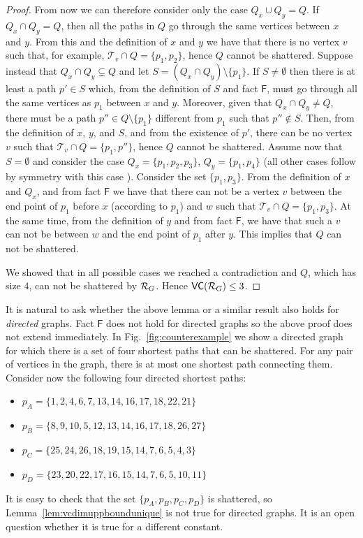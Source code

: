 \begin{proof}
  From now we can therefore consider only the case $Q_x\cup Q_y=Q$. If $Q_x\cap
  Q_y=Q$, then all the paths in $Q$ go through the same vertices between $x$ and
  $y$. From this and the definition of $x$ and $y$ we have that there is no
  vertex $v$ such that, for example, $\mathcal{T}_v\cap Q=\{p_1,p_2\}$, hence
  $Q$ cannot be shattered. Suppose instead that $Q_x\cap Q_y\subsetneq Q$ and let $S=(Q_x\cap
  Q_y)\setminus\{p_1\}$. If $S\neq\emptyset$ then there is at least a path
  $p'\in S$ which, from the definition of $S$ and fact $\mathsf{F}$, must go
  through all the same vertices as $p_1$ between $x$ and $y$. Moreover, given
  that $Q_x\cap Q_y\neq Q$, there must be a path $p''\in Q\setminus\{p_1\}$
  different from $p_1$ such that $p''\notin S$. Then, from the definition of
  $x$, $y$, and $S$, and from the existence of $p'$, there can be no vertex $v$
  such that $\mathcal{T}_v\cap Q=\{p_1,p''\}$, hence $Q$ cannot be shattered.
  Assume now that $S=\emptyset$ and consider the case $Q_x=\{p_1,p_2,p_3\}$,
  $Q_y=\{p_1,p_4\}$ (all other cases follow by symmetry with this case ).
  Consider the set $\{p_1,p_3\}$. From the definition of $x$ and $Q_x$, and from
  fact $\mathsf{F}$ we have that there can not be a vertex $v$ between the end
  point of $p_1$ before $x$ (according to $p_1$) and $w$ such that $\mathcal{T}_v\cap Q=\{p_1,p_3\}$.
  At the same time, from the definition of $y$ and from fact $\mathsf{F}$, we
  have that such a $v$ can not be between $w$ and the end point of $p_1$ after
  $y$. This implies that $Q$ can not be shattered.

  We showed that in all possible cases we reached a contradiction and $Q$,
  which has size $4$, can not be shattered by $\mathcal{R}_G$. Hence $\mathsf{VC}(\mathcal{R}_G)\le
  3$.
\end{proof}

It is natural to ask whether the above lemma or a similar result also holds for
\emph{directed} graphs. Fact $\mathsf{F}$ does not hold for directed graphs so
the above proof does not extend immediately. In Fig.~\ref{fig:counterexample} we show
a directed graph for which there is a set of four shortest paths that can
be shattered. For any pair of vertices in the graph, there is at most one
shortest path connecting them. Consider now the
following four directed shortest paths:
\begin{itemize}
  \item $p_A=\{1,2,4,6,7,13,14,16,17,18,22,21\}$
  \item $p_B=\{8,9,10,5,12,13,14,16,17,18,26,27\}$
  \item $p_C=\{25,24,26,18,19,15,14,7,6,5,4,3\}$
  \item $p_D=\{23,20,22,17,16,15,14,7,6,5,10,11\}$
\end{itemize}
It is easy to check that the set $\{p_A,p_B,p_C,p_D\}$ is shattered, so
Lemma~\ref{lem:vcdimuppboundunique} is not true for directed graphs. It is an
open question whether it is true for a different constant.

